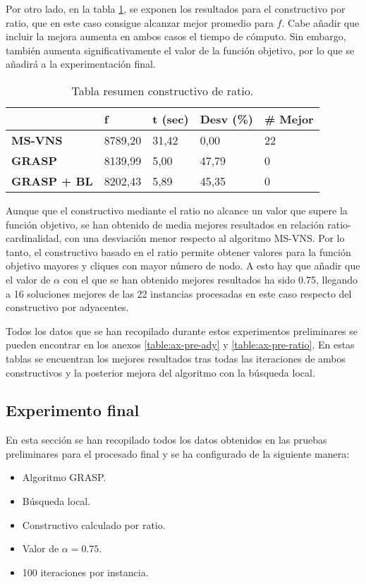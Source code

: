 Por otro lado, en la tabla \ref{tab:pre-ratio}, se exponen los resultados para el constructivo por ratio, que en este caso consigue alcanzar mejor promedio para $f$. Cabe añadir que incluir la mejora aumenta en ambos casos el tiempo de cómputo. Sin embargo, también aumenta significativamente el valor de la función objetivo, por lo que se añadirá a la experimentación final.\\

\begin{table}[H]
	\centering
	\begin{tabular}{lllll}
		\hline
		& \textbf{f} & \textbf{t (sec)} & \textbf{Desv (\%)} & \textbf{\# Mejor} \\ \hline
		\textbf{MS-VNS}     & 8789,20    & 31,42            & 0,00             & 22                \\
		\textbf{GRASP}      & 8139,99    & 5,00             & 47,79            & 0                 \\
		\textbf{GRASP + BL} & 8202,43    & 5,89             & 45,35            & 0                 \\ \hline
	\end{tabular}
	\caption{Tabla resumen constructivo de ratio.}
	\label{tab:pre-ratio}
\end{table}

Aunque que el constructivo mediante el ratio no alcance un valor que supere la función objetivo, se han obtenido de media mejores resultados en relación ratio-cardinalidad, con una desviación menor respecto al algoritmo MS-VNS. Por lo tanto, el constructivo basado en el ratio permite obtener valores para la función objetivo mayores y cliques con mayor número de nodo. A esto hay que añadir que el valor de $\alpha$ con el que se han obtenido mejores resultados ha sido 0.75, llegando a 16 soluciones mejores de las 22 instancias procesadas en este caso respecto del constructivo por adyacentes.

Todos los datos que se han recopilado durante estos experimentos preliminares se pueden encontrar en los anexos \ref{table:ax-pre-ady} y \ref{table:ax-pre-ratio}. En estas tablas se encuentran los mejores resultados tras todas las iteraciones de ambos constructivos y la posterior mejora del algoritmo con la búsqueda local.

\subsection{Experimento final}

En esta sección se han recopilado todos los datos obtenidos en las pruebas preliminares para el procesado final y se ha configurado de la siguiente manera:
\begin{itemize}
	\item Algoritmo \gls{GRASP}.
	\item Búsqueda local.
	\item Constructivo calculado por ratio.
	\item Valor de $\alpha = 0.75$. 
	\item 100 iteraciones por instancia.
\end{itemize}

